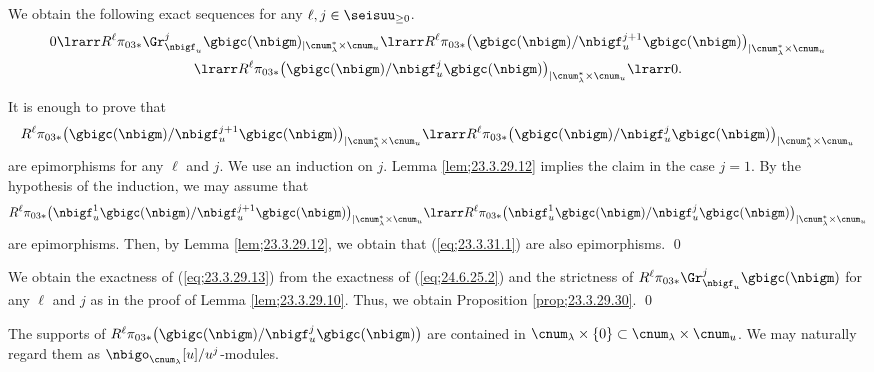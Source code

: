 \documentclass[a4,10pt]{article}
\begin{document}
\begin{lem}
We obtain the following exact sequences
for any $\ell,j\in\seisuu_{\geq 0}$.
\begin{multline}
\label{eq;24.6.25.2}
 0\lrarr
      R^{\ell}\pi_{03\ast}
 \Gr^{j}_{\nbigf_u}\gbigc(\nbigm)_{|\cnum^{\ast}_{\lambda}\times\cnum_u}
 \lrarr
            R^{\ell}\pi_{03\ast}\bigl(
 \gbigc(\nbigm)/\nbigf_u^{j+1}\gbigc(\nbigm) \bigr)
 _{|\cnum^{\ast}_{\lambda}\times\cnum_u}
 \\
      \lrarr
            R^{\ell}\pi_{03\ast}\bigl(
      \gbigc(\nbigm)/\nbigf_u^{j}\gbigc(\nbigm)
 \bigr)
 _{|\cnum^{\ast}_{\lambda}\times\cnum_u}
\lrarr0.
\end{multline}      
\end{lem}
\pf
It is enough to prove that
\begin{equation}
\label{eq;23.3.31.1}
             R^{\ell}\pi_{03\ast}\bigl(
 \gbigc(\nbigm)/\nbigf_u^{j+1}\gbigc(\nbigm) \bigr)
 _{|\cnum^{\ast}_{\lambda}\times\cnum_u}
      \lrarr
            R^{\ell}\pi_{03\ast}\bigl(
      \gbigc(\nbigm)/\nbigf_u^{j}\gbigc(\nbigm)
 \bigr)
 _{|\cnum^{\ast}_{\lambda}\times\cnum_u}
\end{equation}
are epimorphisms for any $\ell$ and $j$.
We use an induction on $j$.
Lemma \ref{lem;23.3.29.12} implies
the claim in the case $j=1$.
By the hypothesis of the induction,
we may assume that
\[
              R^{\ell}\pi_{03\ast}\bigl(
 \nbigf_u^1\gbigc(\nbigm)/\nbigf_u^{j+1}\gbigc(\nbigm) \bigr)
 _{|\cnum^{\ast}_{\lambda}\times\cnum_u}
      \lrarr
            R^{\ell}\pi_{03\ast}\bigl(
      \nbigf_u^1\gbigc(\nbigm)/\nbigf_u^{j}\gbigc(\nbigm)
 \bigr)
 _{|\cnum^{\ast}_{\lambda}\times\cnum_u}
\]
are epimorphisms.
Then, by Lemma \ref{lem;23.3.29.12},
we obtain that
(\ref{eq;23.3.31.1}) are also epimorphisms.
\hfill\qed

\vspace{.1in}
We obtain the exactness of (\ref{eq;23.3.29.13})
from the exactness of (\ref{eq;24.6.25.2})
and the strictness of
$R^{\ell}\pi_{03\ast}
\Gr_{\nbigf_u}^j\gbigc(\nbigm)$
for any $\ell$ and $j$
as in the proof of Lemma \ref{lem;23.3.29.10}.
Thus, we obtain Proposition \ref{prop;23.3.29.30}.
\hfill\qed


\vspace{.1in}
The supports of
$R^{\ell}\pi_{03\ast}\bigl(
\gbigc(\nbigm)/\nbigf_u^j\gbigc(\nbigm)
\bigr)$
are contained in
$\cnum_{\lambda}\times\{0\}\subset\cnum_{\lambda}\times\cnum_u$.
We may naturally regard them
as $\nbigo_{\cnum_{\lambda}}[u]/u^{j}$-modules.
\end{document}
